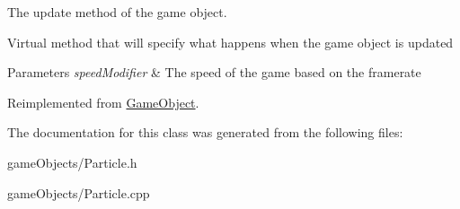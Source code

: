 The update method of the game object. 

Virtual method that will specify what happens when the game object is updated 
\begin{DoxyParams}{Parameters}
{\em speed\+Modifier} & The speed of the game based on the framerate \\
\hline
\end{DoxyParams}


Reimplemented from \hyperlink{class_game_object_acf6423054877d1344b6e0b1f4e740df5}{Game\+Object}.



The documentation for this class was generated from the following files\+:\begin{DoxyCompactItemize}
\item 
game\+Objects/Particle.\+h\item 
game\+Objects/Particle.\+cpp\end{DoxyCompactItemize}
